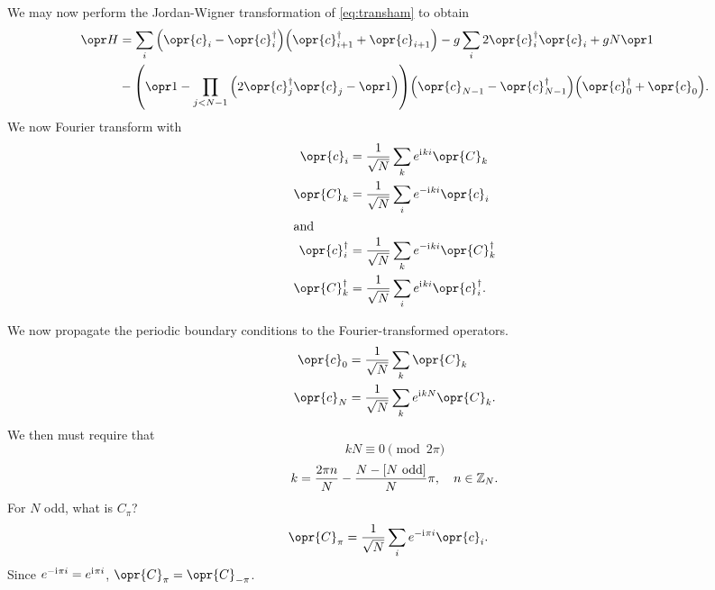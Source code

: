 \documentclass[../thesis.tex]{subfiles}
\begin{document}
We may now perform the Jordan-Wigner transformation of \cref{eq:transham} to
obtain
\begin{equation}
  \begin{aligned}
    \ham
    &= \sum_i \qty(\opr{c}_i - \opr{c}_i^\dag) \qty(\opr{c}_{i+1}^\dag +
    \opr{c}_{i+1})
    - g\sum_i 2\opr{c}_i^\dag\opr{c}_i
    + g N \idopr \\
    &- \qty(\idopr - \prod_{j < N-1}\qty(2\opr{c}_j^\dag \opr{c}_j - \idopr))
    \qty(\opr{c}_{N-1} - \opr{c}_{N-1}^\dag) \qty(\opr{c}_0^\dag + \opr{c}_0).
  \end{aligned}
  \label{eq:cham}
\end{equation}
We now Fourier transform with
\begin{subequations}
\begin{align}
  \opr{c}_i
  &= \frac{1}{\sqrt{N}}\sum_k e^{\im ki} \opr{C}_k
  \label{eq:fourierc} \\
  \opr{C}_k
  &= \frac{1}{\sqrt{N}}\sum_i e^{-\im ki} \opr{c}_i
  \label{eq:fourierC} \\
  \shortintertext{and}
  \opr{c}_i^\dag
  &= \frac{1}{\sqrt{N}}\sum_k e^{-\im ki} \opr{C}_k^\dag
  \label{eq:fourierct} \\
  \opr{C}_k^\dag
  &= \frac{1}{\sqrt{N}}\sum_i e^{\im ki} \opr{c}_i^\dag
  \label{eq:fourierCt}.
\end{align}\label{eq:fourier}
\end{subequations}

We now propagate the periodic boundary conditions to the Fourier-transformed
operators.
\begin{align}
  \opr{c}_0
  &= \frac{1}{\sqrt{N}}\sum_k \opr{C}_k \\
  \opr{c}_N
  &= \frac{1}{\sqrt{N}}\sum_k e^{\im kN} \opr{C}_k.
\end{align}
We then must require that
\begin{equation}
  kN
  \equiv 0 \pmod{2\pi}
\end{equation}
\begin{equation}
  k
  = \frac{2\pi n}{N} - \frac{N - [\text{$N$ odd}]}{N}\pi \qc
  n \in \ZZ_N.
  \label{eq:fourierk}
\end{equation}
For $N$ odd, what is $C_{\pi}$?
\begin{align}
  \opr{C}_{\pi}
  &= \frac{1}{\sqrt{N}} \sum_i e^{-\im \pi i} \opr{c}_i.
\end{align}
Since $e^{-\mathrm{i}\mkern1mu\pi i} = e^{\mathrm{i}\mkern1mu\pi i}$, $\opr{C}_\pi = \opr{C}_{-\pi}$.
\end{document}
